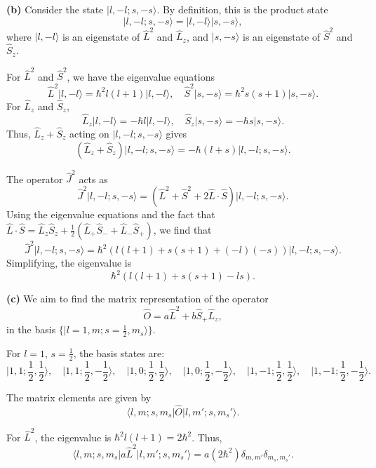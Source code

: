 \documentclass{article}
\begin{document}
\textbf{(b)}  
Consider the state $\lvert l, -l; s, -s \rangle$. By definition, this is the product state  
\[
\lvert l, -l; s, -s \rangle = \lvert l, -l \rangle \lvert s, -s \rangle,
\]  
where $\lvert l, -l \rangle$ is an eigenstate of $\hat{L}^2$ and $\hat{L}_z$, and $\lvert s, -s \rangle$ is an eigenstate of $\hat{S}^2$ and $\hat{S}_z$.  

For $\hat{L}^2$ and $\hat{S}^2$, we have the eigenvalue equations  
\[
\hat{L}^2 \lvert l, -l \rangle = \hbar^2 l(l+1) \lvert l, -l \rangle, \quad \hat{S}^2 \lvert s, -s \rangle = \hbar^2 s(s+1) \lvert s, -s \rangle.
\]  
For $\hat{L}_z$ and $\hat{S}_z$,  
\[
\hat{L}_z \lvert l, -l \rangle = -\hbar l \lvert l, -l \rangle, \quad \hat{S}_z \lvert s, -s \rangle = -\hbar s \lvert s, -s \rangle.
\]  
Thus, $\hat{L}_z + \hat{S}_z$ acting on $\lvert l, -l; s, -s \rangle$ gives  
\[
(\hat{L}_z + \hat{S}_z) \lvert l, -l; s, -s \rangle = -\hbar (l + s) \lvert l, -l; s, -s \rangle.
\]  

The operator $\hat{J}^2$ acts as  
\[
\hat{J}^2 \lvert l, -l; s, -s \rangle = (\hat{L}^2 + \hat{S}^2 + 2 \hat{L} \cdot \hat{S}) \lvert l, -l; s, -s \rangle.
\]  
Using the eigenvalue equations and the fact that $\hat{L} \cdot \hat{S} = \hat{L}_z \hat{S}_z + \frac{1}{2} (\hat{L}_+ \hat{S}_- + \hat{L}_- \hat{S}_+)$, we find that  
\[
\hat{J}^2 \lvert l, -l; s, -s \rangle = \hbar^2 \left( l(l+1) + s(s+1) + (-l)(-s) \right) \lvert l, -l; s, -s \rangle.
\]  
Simplifying, the eigenvalue is  
\[
\hbar^2 \left( l(l+1) + s(s+1) - ls \right).
\]  

\textbf{(c)}  
We aim to find the matrix representation of the operator  
\[
\hat{O} = a \hat{L}^2 + b \hat{S}_+ \hat{L}_z,
\]  
in the basis $\{ \lvert l = 1, m; s = \frac{1}{2}, m_s \rangle \}$.  

For $l=1$, $s = \frac{1}{2}$, the basis states are:  
\[
\lvert 1, 1; \frac{1}{2}, \frac{1}{2} \rangle, \quad \lvert 1, 1; \frac{1}{2}, -\frac{1}{2} \rangle, \quad \lvert 1, 0; \frac{1}{2}, \frac{1}{2} \rangle, \quad \lvert 1, 0; \frac{1}{2}, -\frac{1}{2} \rangle, \quad \lvert 1, -1; \frac{1}{2}, \frac{1}{2} \rangle, \quad \lvert 1, -1; \frac{1}{2}, -\frac{1}{2} \rangle.
\]  

The matrix elements are given by  
\[
\langle l, m; s, m_s \rvert \hat{O} \lvert l, m'; s, m_s' \rangle.
\]  

For $\hat{L}^2$, the eigenvalue is $\hbar^2 l(l+1) = 2\hbar^2$. Thus,  
\[
\langle l, m; s, m_s \rvert a \hat{L}^2 \lvert l, m'; s, m_s' \rangle = a (2\hbar^2) \delta_{m,m'} \delta_{m_s,m_s'}.
\]  
\end{document}
